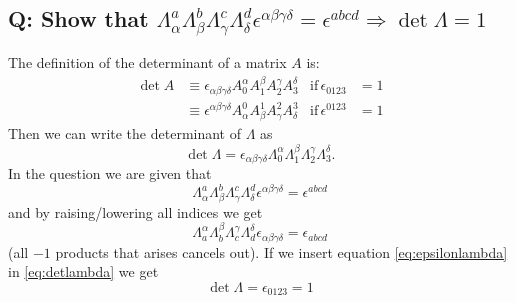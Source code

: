\subsection{Q: Show that $\Lambda_{\alpha}^{a}\Lambda_{\beta}^{b}\Lambda_{\gamma}^{c}\Lambda_{\delta}^{d}\epsilon^{\alpha\beta\gamma\delta}=\epsilon^{abcd} \Rightarrow \det \Lambda= 1$}
The definition of the determinant of a matrix $A$ is:
\begin{align}
\det A &\equiv \epsilon_{\alpha\beta\gamma\delta}A^{\alpha}_{0}A^{\beta}_{1}A^{\gamma}_{2}A^{\delta}_{3} & \text{if} \, \epsilon_{0123}&=1\\
&\equiv \epsilon^{\alpha\beta\gamma\delta}A_{\alpha}^{0}A_{\beta}^{1}A_{\gamma}^{2}A_{\delta}^{3} & \text{if} \, \epsilon^{0123}&=1
\end{align}
Then we can write the determinant of $\Lambda$ as
\begin{equation}
\label{eq:detlambda}
\det \Lambda = \epsilon_{\alpha\beta\gamma\delta}\Lambda^{\alpha}_{0}\Lambda^{\beta}_{1}\Lambda^{\gamma}_{2}\Lambda^{\delta}_{3}.
\end{equation}
In the question we are given that 
\begin{equation}
\Lambda_{\alpha}^{a}\Lambda_{\beta}^{b}\Lambda_{\gamma}^{c}\Lambda_{\delta}^{d}\epsilon^{\alpha\beta\gamma\delta}=\epsilon^{abcd}
\end{equation}
and by raising/lowering all indices we get
\begin{equation}
\label{eq:epsilonlambda}
\Lambda^{\alpha}_{a}\Lambda^{\beta}_{b}\Lambda^{\gamma}_{c}\Lambda^{\delta}_{d}\epsilon_{\alpha\beta\gamma\delta}=\epsilon_{abcd}
\end{equation}
(all $-1$ products that arises cancels out). If we insert equation \ref{eq:epsilonlambda} in \ref{eq:detlambda} we get 
\begin{equation}
\det \Lambda = \epsilon_{0123} = 1
\end{equation}